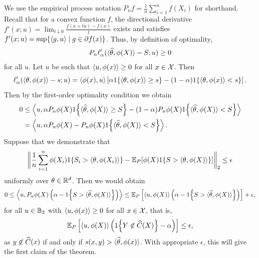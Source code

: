 \documentclass[11pt]{article}
\newcommand{\loss}{\ell}
\newcommand{\scorefunc}{s}
\newcommand{\scoreval}{\scorefunc}
\newcommand{\scorerv}{S}
\begin{document}
We use the empirical process notation
$P_n f = \frac{1}{n} \sum_{i = 1}^n f(X_i)$ for shorthand.
%
Recall that for a convex function $f$, the directional
derivative $f'(x; u) = \lim_{t \downarrow 0} \frac{f(x + tu) - f(x)}{t}$
exists and satisfies $f'(x; u) = \sup\{\langle g, u\rangle \mid g \in \partial f(x)\}$.
Thus, by definition of optimality,
\begin{align*}
  P_n \loss_\alpha'(\<\what{\theta}, \phi(X)\> - \scorerv; u) \ge 0
\end{align*}
for all $u$.
%
Let $u$ be such that $\langle u, \phi(x)\rangle \ge 0$ for all $x \in \mathcal{X}$. Then
\begin{equation*}
  \loss_\alpha'(\<\theta, \phi(x)\> - \scoreval; u)
  = \<\phi(x), u\>
  \left[\alpha \indic{\<\theta, \phi(x)\> \ge \scoreval}
    - (1 - \alpha) \indic{\<\theta, \phi(x)\> < \scoreval}\right].
\end{equation*}
Then by the first-order optimality condition we obtain
\begin{align*}
  0 & \le \left\<u, \alpha P_n \phi(X) \indic{\<\what{\theta}, \phi(X)\>
    \ge \scorerv} - (1 - \alpha) P_n\phi(X)
  \indic{\<\what{\theta}, \phi(X)\> < \scorerv}\right\> \\
  & = \left\<u, \alpha P_n \phi(X)
  - P_n \phi(X) \indic{\<\what{\theta}, \phi(X)\>
    < \scorerv} \right\>.
\end{align*}
Suppose that we demonstrate that
\begin{equation*}
  \ltwobigg{\frac{1}{n} \sum_{i = 1}^n \phi(X_i) \indic{\scorerv_i >
      \<\theta, \phi(X_i)\>}
    -
  \E_P[\phi(X) \indic{\scorerv > \<\theta, \phi(X)\>}]} \le \epsilon
\end{equation*}
uniformly over $\theta \in \mathbb{R}^d$.
%
Then we would obtain
\begin{equation*}
  0 \le \left\<u, P_n \phi(X) \left(\alpha - \indic{\scorerv >
    \<\what{\theta}, \phi(X)\>}\right)\right\>
  \le \E_P\left[\<u, \phi(X)\> \left(\alpha - \indic{\scorerv
      > \<\what{\theta}, \phi(X)\>}\right)\right]
  + \epsilon,
\end{equation*}
for all $u \in \mathbb{B}_2$ with $\langle u, \phi(x)\rangle \ge 0$ for all $x \in \mathcal{X}$,
that is,
\begin{equation}
  \label{eqn:one-sided-thing-to-prove}
  \mathbb{E}_P\left[\langle u, \phi(X)\rangle \left(
    1\!\left\{Y \not \in \widehat{C}(X)\right\} - \alpha\right)\right]
  \le \epsilon,
\end{equation}
as $y \not \in \widehat{C}(x)$ if and only if
$\scoreval(x, y) > \<\what{\theta}, \phi(x)\>$.
%
With appropriate $\epsilon$, this will give the first claim of the theorem.
\end{document}
